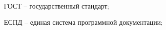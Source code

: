 \newpage
\begin{abbreviations}
	
	ГОСТ -- государственный стандарт;
	
	ЕСПД -- единая система программной документации;
	
\end{abbreviations}